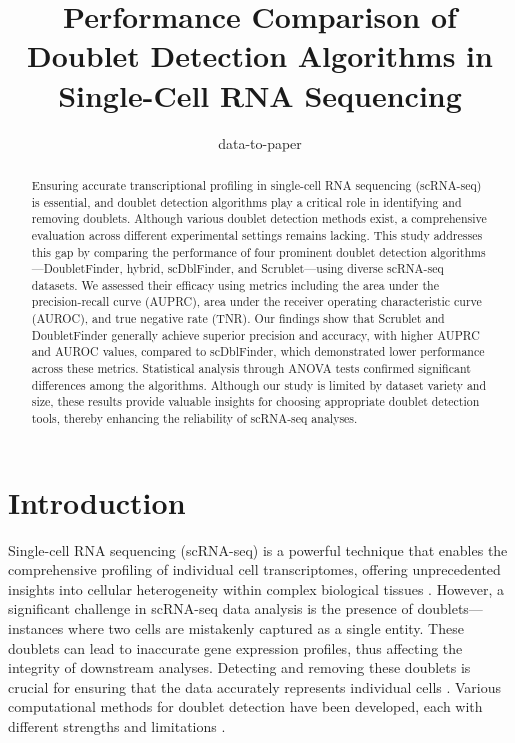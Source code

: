 \documentclass[11pt]{article}
\title{Performance Comparison of Doublet Detection Algorithms in Single-Cell RNA Sequencing}
\author{data-to-paper}
\begin{document}
\maketitle
\begin{abstract}
Ensuring accurate transcriptional profiling in single-cell RNA sequencing (scRNA-seq) is essential, and doublet detection algorithms play a critical role in identifying and removing doublets. Although various doublet detection methods exist, a comprehensive evaluation across different experimental settings remains lacking. This study addresses this gap by comparing the performance of four prominent doublet detection algorithms—DoubletFinder, hybrid, scDblFinder, and Scrublet—using diverse scRNA-seq datasets. We assessed their efficacy using metrics including the area under the precision-recall curve (AUPRC), area under the receiver operating characteristic curve (AUROC), and true negative rate (TNR). Our findings show that Scrublet and DoubletFinder generally achieve superior precision and accuracy, with higher AUPRC and AUROC values, compared to scDblFinder, which demonstrated lower performance across these metrics. Statistical analysis through ANOVA tests confirmed significant differences among the algorithms. Although our study is limited by dataset variety and size, these results provide valuable insights for choosing appropriate doublet detection tools, thereby enhancing the reliability of scRNA-seq analyses.
\end{abstract}
\section*{Introduction}

Single-cell RNA sequencing (scRNA-seq) is a powerful technique that enables the comprehensive profiling of individual cell transcriptomes, offering unprecedented insights into cellular heterogeneity within complex biological tissues \cite{Xi2020BenchmarkingCD, McGinnis2018DoubletFinderDD}. However, a significant challenge in scRNA-seq data analysis is the presence of doublets—instances where two cells are mistakenly captured as a single entity. These doublets can lead to inaccurate gene expression profiles, thus affecting the integrity of downstream analyses. Detecting and removing these doublets is crucial for ensuring that the data accurately represents individual cells \cite{Xi2020BenchmarkingCD}. Various computational methods for doublet detection have been developed, each with different strengths and limitations \cite{McGinnis2018DoubletFinderDD}.
\end{document}
